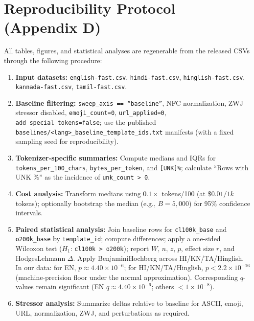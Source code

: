 \documentclass{article}
\begin{document}
\section{Reproducibility Protocol (Appendix D)}
All tables, figures, and statistical analyses are regenerable from the released CSVs through the following procedure:
\begin{enumerate}
    \item \textbf{Input datasets:} \texttt{english-fast.csv}, \texttt{hindi-fast.csv}, \texttt{hinglish-fast.csv}, \texttt{kannada-fast.csv}, \texttt{tamil-fast.csv}.
    \item \textbf{Baseline filtering:} \texttt{sweep\_axis == ``baseline''}, NFC normalization, ZWJ stressor disabled, \texttt{emoji\_count=0}, \texttt{url\_applied=0}, \texttt{add\_special\_tokens=false}; use the published \texttt{baselines/<lang>\_baseline\_template\_ids.txt} manifests (with a fixed sampling seed for reproducibility).
    \item \textbf{Tokenizer-specific summaries:} Compute medians and IQRs for \texttt{tokens\_per\_100\_chars}, \texttt{bytes\_per\_token}, and \texttt{[UNK]\%}; calculate ``Rows with UNK \%'' as the incidence of \texttt{unk\_count > 0}.
    \item \textbf{Cost analysis:} Transform medians using $0.1 \times$ tokens/100 (at $\$0.01/1k$ tokens); optionally bootstrap the median (e.g., $B=5{,}000$) for 95\% confidence intervals.
    \item \textbf{Paired statistical analysis:} Join baseline rows for \texttt{cl100k\_base} and \texttt{o200k\_base} by \texttt{template\_id}; compute differences; apply a one-sided Wilcoxon test ($H_1$: \texttt{cl100k > o200k}); report $W$, $n$, $z$, $p$, effect size $r$, and Hodges\textendash{}Lehmann $\Delta$. Apply Benjamini\textendash{}Hochberg across HI/KN/TA/Hinglish. In our data: for EN, $p \approx 4.40\times10^{-6}$; for HI/KN/TA/Hinglish, $p < 2.2\times10^{-16}$ (machine-precision floor under the normal approximation). Corresponding $q$-values remain significant (EN $q \approx 4.40\times10^{-6}$; others $< 1\times10^{-8}$).
    \item \textbf{Stressor analysis:} Summarize deltas relative to baseline for ASCII, emoji, URL, normalization, ZWJ, and perturbations as required.
\end{enumerate}
\end{document}
